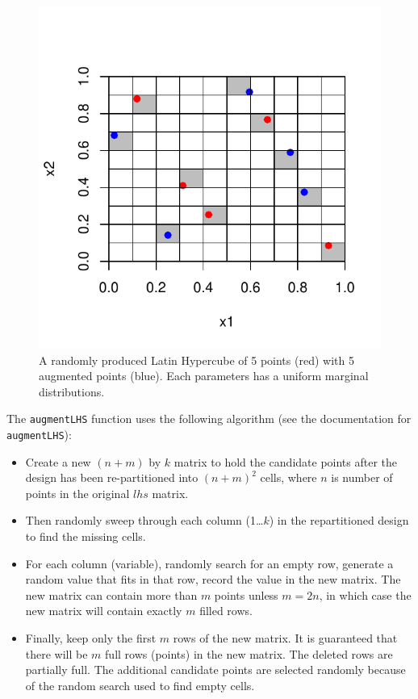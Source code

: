 \documentclass[12pt]{article}
\begin{document}
\begin{figure}[p]
	\centering
		\includegraphics{augmented5.pdf}
	  \caption{A randomly produced Latin Hypercube of 5 points (red) with 5 augmented points (blue).  Each parameters has a uniform marginal distributions.}
	\label{fig:augmented10}
\end{figure}

The \texttt{augmentLHS} function uses the following algorithm (see the documentation for \texttt{augmentLHS}):
\begin{itemize}
	\item Create a new $(n+m)$ by $k$ matrix to hold the candidate points after the design has
been re-partitioned into $(n+m)^{2}$ cells, where $n$ is number of
points in the original $lhs$ matrix.\\
  \item Then randomly sweep through each
column (1\ldots$k$) in the repartitioned design to find the missing cells.\\
  \item For each column (variable), randomly search for an empty row, generate a
random value that fits in that row, record the value in the new matrix.
The new matrix can contain more than $m$ points unless $m = 2n$,
in which case the new matrix will contain exactly $m$ filled rows.\\
  \item Finally, keep only the first $m$ rows of the new matrix.  It is guaranteed that there
will be $m$ full rows (points) in the new matrix.  The deleted rows are partially full.
The additional candidate points are selected randomly because of the random search
used to find empty cells.\\
\end{itemize}
  
\end{document}
